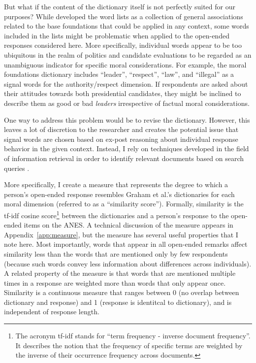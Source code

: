 \documentclass[12pt]{article}
\begin{document}
But what if the content of the dictionary itself is not perfectly suited for our purposes? While \citet{graham2009liberals} developed the word lists as a collection of general associations related to the base foundations that could be applied in any context, some words included in the lists might be problematic when applied to the open-ended responses considered here. More specifically, individual words appear to be too ubiquitous in the realm of politics and candidate evaluations to be regarded as an unambiguous indicator for specific moral considerations. For example, the moral foundations dictionary includes ``leader'', ``respect'', ``law'', and ``illegal'' as a signal words for the authority/respect dimension. If respondents are asked about their attitudes towards both presidential candidates, they might be inclined to describe them as good or bad \textit{leaders} irrespective of factual moral considerations.

One way to address this problem would be to revise the dictionary. However, this leaves a lot of discretion to the researcher and creates the potential issue that signal words are chosen based on ex-post reasoning about individual response behavior in the given context. Instead, I rely on techniques developed in the field of information retrieval in order to identify relevant documents based on search queries \citep[see][for an introduction]{manning2008introduction}.

More specifically, I create a measure that represents the degree to which a person's open-ended response resembles Graham et al.'s \citeyearpar{graham2009liberals} dictionaries for each moral dimension (referred to as a ``similarity score''). Formally, similarity is the tf-idf cosine score\footnote{The acronym tf-idf stands for ``term frequency - inverse document frequency''. It describes the notion that the frequency of specific terms are weighted by the inverse of their occurrence frequency across documents.} between the dictionaries and a person's response to the open-ended items on the ANES. A technical discussion of the measure appears in Appendix~\ref{app:measure}, but the measure has several useful properties that I note here. Most importantly, words that appear in all open-ended remarks affect similarity less than the words that are mentioned only by few respondents (because such words convey less information about differences across individuals). A related property of the measure is that words that are mentioned multiple times in a response are weighted more than words that only appear once. Similarity is a continuous measure that ranges between 0 (no overlap between dictionary and response) and 1 (response is identitcal to dictionary), and is independent of response length.
\end{document}
